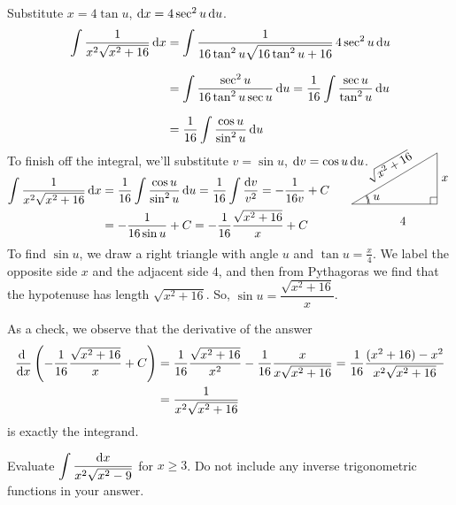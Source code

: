 \begin{solution} 
Substitute $x=4\tan u$, $\mathrm{d}x=4 \sec^2u\,\mathrm{d}u$.
\begin{align*}
\int\frac{1}{x^2\sqrt{x^2+16}}\,\mathrm{d}x
&=\int \frac{1}{16\tan^2 u \sqrt{16\tan^2 u+16}}\,4\sec^2 u\,\mathrm{d}u   \\[0.1in]
&=\int \frac{\sec^2u}{16\tan^2u\sec u}\,\mathrm{d}u
=\frac{1}{16}\int \frac{\sec u}{\tan^2u}\,\mathrm{d}u \\[0.1in]
&= \frac{1}{16}\int\frac{\cos u}{\sin^2 u}\,\mathrm{d}u
\end{align*}
To finish off the integral, we'll substitute $v=\sin u$, 
$\mathrm{d}v=\cos u\,\mathrm{d}u$.
\begin{align*}
\int\frac{1}{x^2\sqrt{x^2+16}}\,\dee{x}
&=\frac{1}{16} \int\frac{\cos u}{\sin^2 u}\,\dee{u}
= \frac{1}{16}\int\frac{\dee{v}}{v^2}
=-\frac{1}{16v} +C \\
&=-\frac{1}{16\sin u} +C 
=-\frac{1}{16}\dfrac{\sqrt{x^2+16}}{x}+C
\hskip0.5in\smash{
\trigtri{u}{4}{x}{\sqrt{x^2+16}}
} 
\end{align*}
To find $\sin u$, we draw a right triangle with angle $u$ and $\tan u = \frac{x}{4}$. We label the opposite side $x$ and the adjacent side $4$, and then from Pythagoras we find that the hypotenuse has length $\sqrt{x^2+16}$. So, $\sin u = \dfrac{\sqrt{x^2+16}}{x}$.

As a check, we observe that the derivative of the answer
\begin{align*}
\diff{}{x}\left(-\frac{1}{16}\frac{\sqrt{x^2+16}}{x}+C\right)
&=\frac{1}{16}\frac{\sqrt{x^2+16}}{x^2} 
       -\frac{1}{16}\frac{x}{x\sqrt{x^2+16}}
=\frac{1}{16}\frac{(x^2+16)-x^2}{x^2\sqrt{x^2+16}} \\
&=\frac{1}{x^2\sqrt{x^2+16}}
\end{align*}
is exactly the integrand.

\end{solution}

\begin{question}[2016A]
Evaluate $\displaystyle\int \frac{\mathrm{d}x}{x^2\sqrt{x^2-9}}$ for $x\ge 3$.
Do not include any inverse trigonometric functions in your answer.
\end{question}

